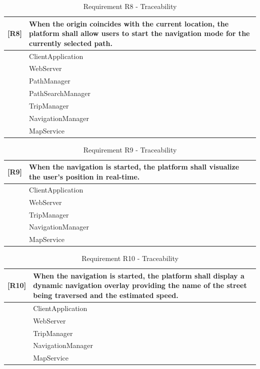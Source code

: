 \begin{table}[H]
    \centering
    \begin{tabular}{|p{1cm}|p{14cm}|}
    \hline
    \textbf{[R8]} & \textbf{When the origin coincides with the current location, the platform shall allow users to start the navigation mode for the currently selected path.} \\ \hline
    [C1] & ClientApplication \\ \hline
    [C2] & WebServer \\ \hline
    [C7] & PathManager \\ \hline
    [C10] & PathSearchManager \\ \hline
    [C11] & TripManager \\ \hline
    [C13] & NavigationManager \\ \hline
    [E2] & MapService \\ \hline
    \end{tabular}
    \caption{Requirement R8 - Traceability}
    \label{tab:RT8}
\end{table}

\begin{table}[H]
    \centering
    \begin{tabular}{|p{1cm}|p{14cm}|}
    \hline
    \textbf{[R9]} & \textbf{When the navigation is started, the platform shall visualize the user’s position in real-time.} \\ \hline
    [C1] & ClientApplication \\ \hline
    [C2] & WebServer \\ \hline
    [C11] & TripManager \\ \hline
    [C13] & NavigationManager \\ \hline
    [E2] & MapService \\ \hline
    \end{tabular}
    \caption{Requirement R9 - Traceability}
    \label{tab:RT9}
\end{table}

\begin{table}[H]
    \centering
    \begin{tabular}{|p{1cm}|p{14cm}|}
    \hline
    \textbf{[R10]} & \textbf{When the navigation is started, the platform shall display a dynamic navigation overlay providing the name of the street being traversed and the estimated speed.} \\ \hline
    [C1] & ClientApplication \\ \hline
    [C2] & WebServer \\ \hline
    [C11] & TripManager \\ \hline
    [C13] & NavigationManager \\ \hline
    [E2] & MapService \\ \hline
    \end{tabular}
    \caption{Requirement R10 - Traceability}
    \label{tab:RT10}
\end{table}

